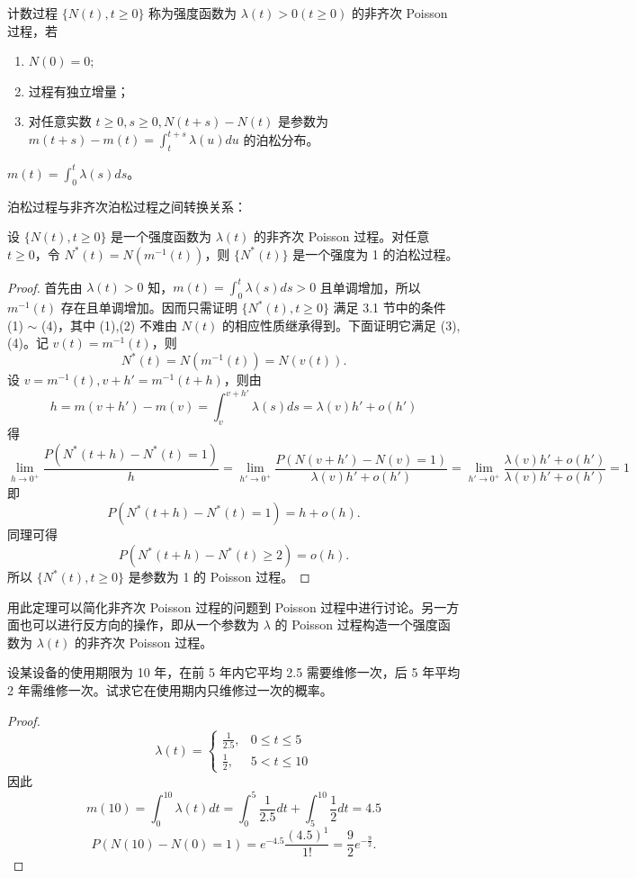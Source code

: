 \documentclass[lang=cn,10pt,thmcnt=section]{elegantbook}
\begin{document}
\begin{definition}
	计数过程 $\{N(t), t \geq 0\}$ 称为强度函数为 $\lambda(t) > 0 (t \geq 0)$ 的非齐次 Poisson 过程，若
\begin{enumerate}
    \item $N(0) = 0$;
    \item 过程有独立增量；
    \item 对任意实数 $t \geq 0, s \geq 0, N(t+s) - N(t)$ 是参数为 $m(t+s) - m(t) = \int_{t}^{t+s} \lambda(u) du$ 的泊松分布。
\end{enumerate}
\end{definition}
\begin{remark}
	\(m(t) = \int_{0}^{t} \lambda(s) ds\)。

\end{remark}
泊松过程与非齐次泊松过程之间转换关系：

\begin{theorem}
	设 $\{N(t), t \geq 0\}$ 是一个强度函数为 $\lambda(t)$ 的非齐次 Poisson 过程。对任意 $t \geq 0$，令 $N^*(t) = N(m^{-1}(t))$，则 $\{N^*(t)\}$ 是一个强度为 1 的泊松过程。
\end{theorem}
\begin{proof}
	首先由 $\lambda(t) > 0$ 知，$m(t) = \int_{0}^{t} \lambda(s) ds > 0$ 且单调增加，所以 $m^{-1}(t)$ 存在且单调增加。因而只需证明 $\{N^*(t), t \geq 0\}$ 满足 3.1 节中的条件 (1) $\sim$ (4)，其中 (1),(2) 不难由 $N(t)$ 的相应性质继承得到。下面证明它满足 (3),(4)。记 $v(t) = m^{-1}(t)$，则
\[
N^*(t) = N(m^{-1}(t)) = N(v(t)).
\]
设 $v = m^{-1}(t), v + h' = m^{-1}(t + h)$，则由
\[
h = m(v + h') - m(v) = \int_{v}^{v+h'} \lambda(s) ds = \lambda(v) h' + o(h')
\]
得
\[
\lim_{h \to 0^+} \frac{P(N^*(t + h) - N^*(t) = 1)}{h} = \lim_{h' \to 0^+} \frac{P(N(v + h') - N(v) = 1)}{\lambda(v) h' + o(h')} = \lim_{h' \to 0^+} \frac{\lambda(v) h' + o(h')}{\lambda(v) h' + o(h')} = 1
\]
即
\[
P(N^*(t + h) - N^*(t) = 1) = h + o(h).
\]
同理可得
\[
P(N^*(t + h) - N^*(t) \geq 2) = o(h).
\]
所以 $\{N^*(t), t \geq 0\}$ 是参数为 1 的 Poisson 过程。
\end{proof}

\begin{remark}

	用此定理可以简化非齐次 Poisson 过程的问题到 Poisson 过程中进行讨论。另一方面也可以进行反方向的操作，即从一个参数为 $\lambda$ 的 Poisson 过程构造一个强度函数为 $\lambda(t)$ 的非齐次 Poisson 过程。
\end{remark}
\begin{example}
	设某设备的使用期限为 10 年，在前 5 年内它平均 2.5 需要维修一次，后 5 年平均 2 年需维修一次。试求它在使用期内只维修过一次的概率。
\end{example}
\begin{proof}
\[
\lambda(t) = 
\begin{cases} 
\frac{1}{2.5}, & 0 \leq t \leq 5 \\
\frac{1}{2}, & 5 < t \leq 10 
\end{cases}
\]
因此
\[
m(10) = \int_{0}^{10} \lambda(t) dt = \int_{0}^{5} \frac{1}{2.5} dt + \int_{5}^{10} \frac{1}{2} dt = 4.5
\]
\[
P(N(10) - N(0) = 1) = e^{-4.5} \frac{(4.5)^1}{1!} = \frac{9}{2} e^{-\frac{9}{2}}.
\]
\end{proof}
\end{document}
